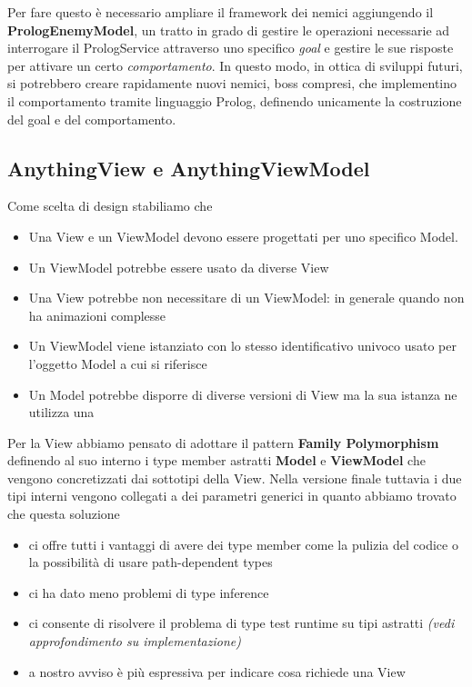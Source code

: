 Per fare questo è necessario ampliare il framework dei nemici aggiungendo il \textbf{PrologEnemyModel}, 
un tratto in grado di gestire le operazioni necessarie ad interrogare il PrologService attraverso uno specifico \textit{goal} 
e gestire le sue risposte per attivare un certo \textit{comportamento}.
In questo modo, in ottica di sviluppi futuri, si potrebbero creare rapidamente nuovi nemici, boss compresi, che implementino il comportamento tramite linguaggio Prolog, definendo unicamente la costruzione del goal e del comportamento.

\subsection{AnythingView e AnythingViewModel}
 
Come scelta di design stabiliamo che 
\begin{itemize}
    \item Una View e un ViewModel devono essere progettati per uno specifico Model.
    \item Un ViewModel potrebbe essere usato da diverse View
    \item Una View potrebbe non necessitare di un ViewModel: in generale quando non ha animazioni complesse
    \item Un ViewModel viene istanziato con lo stesso identificativo univoco usato per l'oggetto Model a cui si riferisce
    \item Un Model potrebbe disporre di diverse versioni di View ma la sua istanza ne utilizza una
\end{itemize}
Per la View abbiamo pensato di adottare il pattern \textbf{Family Polymorphism} definendo al suo interno i type member astratti \textbf{Model} e \textbf{ViewModel} che vengono concretizzati dai sottotipi della View.
Nella versione finale tuttavia i due tipi interni vengono collegati a dei parametri generici in quanto abbiamo trovato che questa soluzione
\begin{itemize}
    \item ci offre tutti i vantaggi di avere dei type member come la pulizia del codice o la possibilità di usare path-dependent types
    \item ci ha dato meno problemi di type inference 
    \item ci consente di risolvere il problema di type test runtime su tipi astratti \textit{(vedi approfondimento su implementazione)}
    \item a nostro avviso è più espressiva per indicare cosa richiede una View
\end{itemize}

